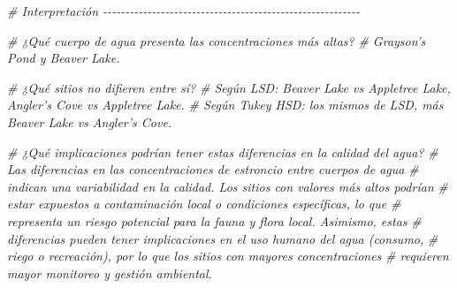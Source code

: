 \documentclass[
]{article}
\newenvironment{Shaded}{\begin{snugshade}}{\end{snugshade}}
\newcommand{\CommentTok}[1]{\textcolor[rgb]{0.56,0.35,0.01}{\textit{#1}}}
\begin{document}
\begin{Shaded}
\begin{Highlighting}[]
\CommentTok{\# Interpretación {-}{-}{-}{-}{-}{-}{-}{-}{-}{-}{-}{-}{-}{-}{-}{-}{-}{-}{-}{-}{-}{-}{-}{-}{-}{-}{-}{-}{-}{-}{-}{-}{-}{-}{-}{-}{-}{-}{-}{-}{-}{-}{-}{-}{-}{-}{-}{-}{-}{-}{-}{-}{-}{-}{-}{-}{-}{-}}

\CommentTok{\# ¿Qué cuerpo de agua presenta las concentraciones más altas?}
\CommentTok{\# Grayson’s Pond y Beaver Lake.}

\CommentTok{\# ¿Qué sitios no difieren entre sí?}
\CommentTok{\# Según LSD: Beaver Lake vs Appletree Lake, Angler’s Cove vs Appletree Lake.}
\CommentTok{\# Según Tukey HSD: los mismos de LSD, más Beaver Lake vs Angler’s Cove.}

\CommentTok{\# ¿Qué implicaciones podrían tener estas diferencias en la calidad del agua?}
\CommentTok{\# Las diferencias en las concentraciones de estroncio entre cuerpos de agua }
\CommentTok{\# indican una variabilidad en la calidad. Los sitios con valores más altos podrían}
\CommentTok{\# estar expuestos a contaminación local o condiciones específicas, lo que}
\CommentTok{\# representa un riesgo potencial para la fauna y flora local. Asimismo, estas }
\CommentTok{\# diferencias pueden tener implicaciones en el uso humano del agua (consumo, }
\CommentTok{\# riego o recreación), por lo que los sitios con mayores concentraciones }
\CommentTok{\# requieren mayor monitoreo y gestión ambiental.}
\end{Highlighting}
\end{Shaded}
\end{document}
